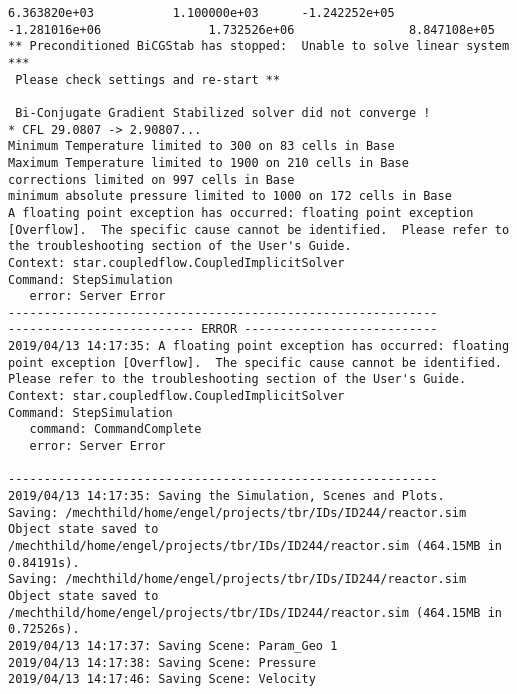 \documentclass{article}
\begin{document}
{\begin{verbatim}
6.363820e+03           1.100000e+03      -1.242252e+05                         -1.281016e+06               1.732526e+06                8.847108e+05 
** Preconditioned BiCGStab has stopped:  Unable to solve linear system *** 
 Please check settings and re-start ** 

 Bi-Conjugate Gradient Stabilized solver did not converge !
* CFL 29.0807 -> 2.90807...
Minimum Temperature limited to 300 on 83 cells in Base
Maximum Temperature limited to 1900 on 210 cells in Base
corrections limited on 997 cells in Base
minimum absolute pressure limited to 1000 on 172 cells in Base
A floating point exception has occurred: floating point exception [Overflow].  The specific cause cannot be identified.  Please refer to the troubleshooting section of the User's Guide.
Context: star.coupledflow.CoupledImplicitSolver
Command: StepSimulation
   error: Server Error
------------------------------------------------------------
-------------------------- ERROR ---------------------------
2019/04/13 14:17:35: A floating point exception has occurred: floating point exception [Overflow].  The specific cause cannot be identified.  Please refer to the troubleshooting section of the User's Guide.
Context: star.coupledflow.CoupledImplicitSolver
Command: StepSimulation
   command: CommandComplete
   error: Server Error

------------------------------------------------------------
2019/04/13 14:17:35: Saving the Simulation, Scenes and Plots.
Saving: /mechthild/home/engel/projects/tbr/IDs/ID244/reactor.sim
Object state saved to /mechthild/home/engel/projects/tbr/IDs/ID244/reactor.sim (464.15MB in 0.84191s).
Saving: /mechthild/home/engel/projects/tbr/IDs/ID244/reactor.sim
Object state saved to /mechthild/home/engel/projects/tbr/IDs/ID244/reactor.sim (464.15MB in 0.72526s).
2019/04/13 14:17:37: Saving Scene: Param_Geo 1
2019/04/13 14:17:38: Saving Scene: Pressure
2019/04/13 14:17:46: Saving Scene: Velocity
\end{verbatim}
}
\clearpage
\end{document}
